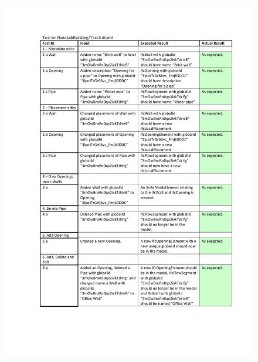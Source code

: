 \begin{figure}[ht]
    \centering
        \centerline{\includegraphics[width=150mm]{images/Test3.pdf}}
    \caption{}
    \label{fig:test3}
\end{figure}
